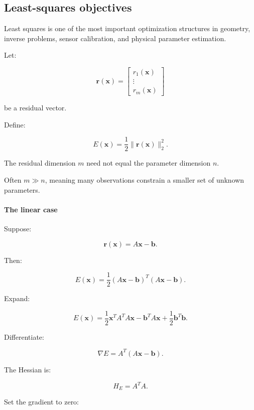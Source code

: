\subsection{Least-squares objectives}\label{02-foundations-ii-ch026-least-squares-objectives}

\hypertarget{02-foundations-ii-ch026-least-squares-objectives}{}

Least squares is one of the most important optimization structures in geometry, inverse problems, sensor calibration, and physical parameter estimation.

Let:

\[
\mathbf r(\mathbf x)= \begin{bmatrix} r_1(\mathbf x)\\ \vdots\\ r_m(\mathbf x) \end{bmatrix}
\]

be a residual vector.

Define:

\[
\boxed{ E(\mathbf x)=\frac12\|\mathbf r(\mathbf x)\|_2^2 }.
\]

The residual dimension \(m\) need not equal the parameter dimension \(n\).

Often \(m\gg n\), meaning many observations constrain a smaller set of unknown parameters.

\paragraph{The linear case}\label{02-foundations-ii-ch026-the-linear-case}

\hypertarget{02-foundations-ii-ch026-the-linear-case}{}

Suppose:

\[
\mathbf r(\mathbf x)=A\mathbf x-\mathbf b.
\]

Then:

\[
E(\mathbf x)= \frac12(A\mathbf x-\mathbf b)^T(A\mathbf x-\mathbf b).
\]

Expand:

\[
E(\mathbf x) = \frac12\mathbf x^TA^TA\mathbf x -\mathbf b^TA\mathbf x +\frac12\mathbf b^T\mathbf b.
\]

Differentiate:

\[
\boxed{ \nabla E=A^T(A\mathbf x-\mathbf b) }.
\]

The Hessian is:

\[
\boxed{H_E=A^TA}.
\]

Set the gradient to zero:

